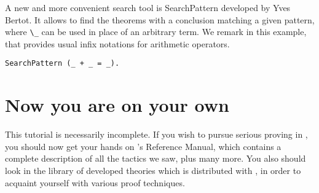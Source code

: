 \documentclass{book}
\begin{document}
A new and more convenient search tool is \textsf{SearchPattern}
developed by Yves Bertot. It allows to find the theorems with a
conclusion matching a given pattern, where \verb:\_: can be used in
place of an arbitrary term. We remark in this example, that \Coq{}
provides usual infix notations for arithmetic operators.

\begin{lstlisting}
SearchPattern (_ + _ = _).
\end{lstlisting}

\section{Now you are on your own}

This tutorial is necessarily incomplete. If you wish to pursue serious
proving in \Coq, you should now get your hands on \Coq's Reference Manual,
which contains a complete description of all the tactics we saw, 
plus many more.
You also should look in the library of developed theories which is distributed
with \Coq, in order to acquaint yourself with various proof techniques.
\end{document}
